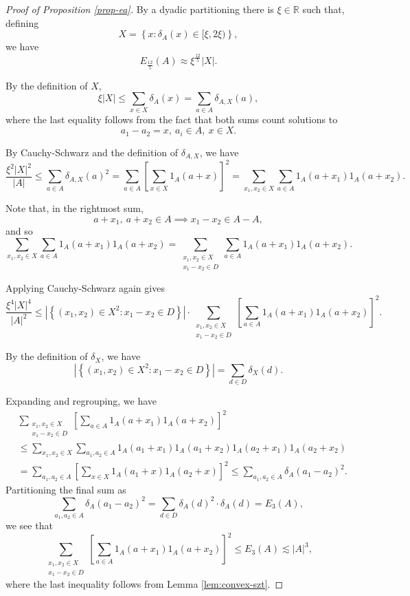 \documentclass[reqno]{amsart}
\numberwithin{equation}{section}
\begin{document}
\begin{proof}[Proof of Proposition \ref{prop-ea}]
By a dyadic partitioning there is \(\xi \in \mathbb{R} \) such that, defining
\[
    X = \left\{ x : \delta_{A} (x) \in [\xi,2\xi) \right\} 
,\]
we have
\[
    E_{\frac{12}{5} } (A) \approx \xi^{\frac{12}{5} } \left\lvert X \right\rvert 
.\]

By the definition of \(X\),
\[
    \xi \left\lvert X \right\rvert \leq \sum _{x \in X} \delta_{A} (x) = \sum _{a \in A} \delta_{A,X} (a)
,\]
where the last equality follows from the fact that both sums count solutions to
\[
    a_1 - a_2 = x ,~ a_{i} \in A,~ x \in X
.\]

By Cauchy-Schwarz and the definition of \(\delta_{A,X}  \), we have
\[
    \frac{\xi^{2} \left\lvert X \right\rvert ^{2}}{\left\lvert A \right\rvert } \leq \sum _{a \in A} \delta_{A,X} (a)^{2} = \sum _{a \in A} \left[ \sum _{x \in X} 1_{A} (a + x)  \right] ^{2} = \sum _{x_1,x_2 \in X} \sum _{a \in A} 1_{A} (a + x_1) 1_{A} (a + x_2)
.\]

Note that, in the rightmost sum,
\[
    a + x_1 ,~ a + x_2 \in A \implies  x_1 - x_2 \in A-A
,\]
and so
\[
    \sum _{x_1,x_2 \in X} \sum _{a \in A} 1_{A} (a + x_1) 1_{A} (a + x_2)= \sum _{\substack{ x_1, x_2 \in X \\ x_1 - x_2 \in D }} \sum _{a \in A} 1_{A} (a + x_1)1_{A} (a + x_2)
.\]

Applying Cauchy-Schwarz again gives
\begin{equation} \label{eq:diff-big-CS}
    \frac{\xi^{4} \left\lvert X \right\rvert ^{4}}{\left\lvert A \right\rvert ^{2}} \leq \left\lvert \left\{ (x_1,x_2)\in X^{2} : x_1-x_2 \in D \right\}  \right\rvert \cdot \sum _{\substack{ x_1,x_2 \in X \\ x_1 - x_2 \in D }} \left[ \sum _{a \in A} 1_{A} (a + x_1) 1_{A} (a + x_2) \right] ^{2}.
\end{equation}  

By the definition of \(\delta_{X} \), we have
\[
    \left\lvert \left\{ (x_1,x_2)\in X^{2} : x_1-x_2\in D \right\}  \right\rvert = \sum _{d \in D} \delta_{X} (d)
.\]

Expanding and regrouping, we have
\begin{align*}
    & \sum _{\substack{ x_1,x_2 \in X \\ x_1 - x_2 \in D }} \left[ \sum _{a \in A} 1_{A} (a + x_1) 1_{A} (a + x_2) \right] ^{2} \\
    & \leq \sum _{x_1,x_2 \in X} \sum _{a_1,a_2 \in A} 1_{A} (a_1 + x_1)1_{A} (a_1 + x_2) 1_{A} (a_2 + x_1)1_{A} (a_2 + x_2)  \\
    & = \sum _{a_1,a_2 \in A} \left[ \sum _{x \in X} 1_{A} (a_1 + x)1_{A} (a_2 + x) \right] ^{2} \leq \sum _{a_1,a_2 \in A} \delta_{A} (a_1-a_2)^{2}.
\end{align*}
Partitioning the final sum as
\[
    \sum _{a_1,a_2 \in A} \delta_{A} (a_1-a_2)^{2} = \sum _{d \in D} \delta_{A} (d)^{2} \cdot \delta_{A} (d) = E_3(A)
,\]
we see that
\[
    \sum _{\substack{ x_1,x_2 \in X \\ x_1 - x_2 \in D }} \left[ \sum _{a \in A} 1_{A} (a + x_1) 1_{A} (a + x_2) \right] ^{2} \leq E_3(A) \lesssim \left\lvert A \right\rvert ^{3} 
,\]
where the last inequality follows from Lemma \ref{lem:convex-szt}.


\end{proof}
\end{document}
